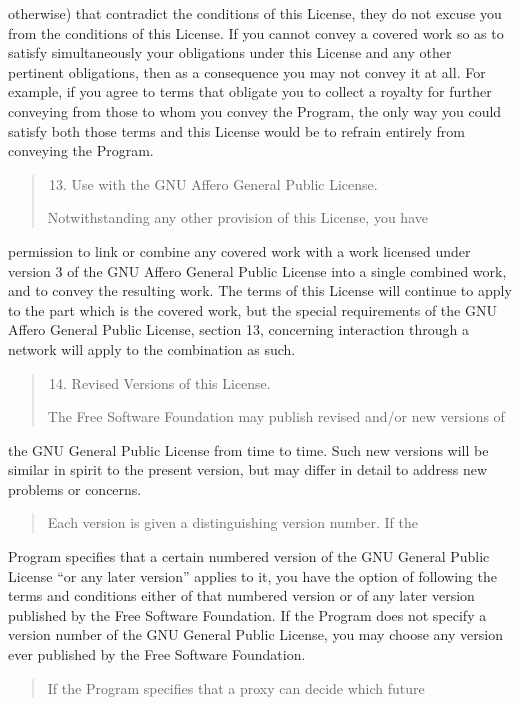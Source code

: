 \documentclass[letterpaper,10pt,english]{sphinxmanual}
\begin{document}
otherwise) that contradict the conditions of this License, they do not
excuse you from the conditions of this License.  If you cannot convey a
covered work so as to satisfy simultaneously your obligations under this
License and any other pertinent obligations, then as a consequence you may
not convey it at all.  For example, if you agree to terms that obligate you
to collect a royalty for further conveying from those to whom you convey
the Program, the only way you could satisfy both those terms and this
License would be to refrain entirely from conveying the Program.
\begin{quote}
\begin{enumerate}
\setcounter{enumi}{12}
\item {} 
Use with the GNU Affero General Public License.

\end{enumerate}

Notwithstanding any other provision of this License, you have
\end{quote}

permission to link or combine any covered work with a work licensed
under version 3 of the GNU Affero General Public License into a single
combined work, and to convey the resulting work.  The terms of this
License will continue to apply to the part which is the covered work,
but the special requirements of the GNU Affero General Public License,
section 13, concerning interaction through a network will apply to the
combination as such.
\begin{quote}
\begin{enumerate}
\setcounter{enumi}{13}
\item {} 
Revised Versions of this License.

\end{enumerate}

The Free Software Foundation may publish revised and/or new versions of
\end{quote}

the GNU General Public License from time to time.  Such new versions will
be similar in spirit to the present version, but may differ in detail to
address new problems or concerns.
\begin{quote}

Each version is given a distinguishing version number.  If the
\end{quote}

Program specifies that a certain numbered version of the GNU General
Public License “or any later version” applies to it, you have the
option of following the terms and conditions either of that numbered
version or of any later version published by the Free Software
Foundation.  If the Program does not specify a version number of the
GNU General Public License, you may choose any version ever published
by the Free Software Foundation.
\begin{quote}

If the Program specifies that a proxy can decide which future
\end{quote}
\end{document}
